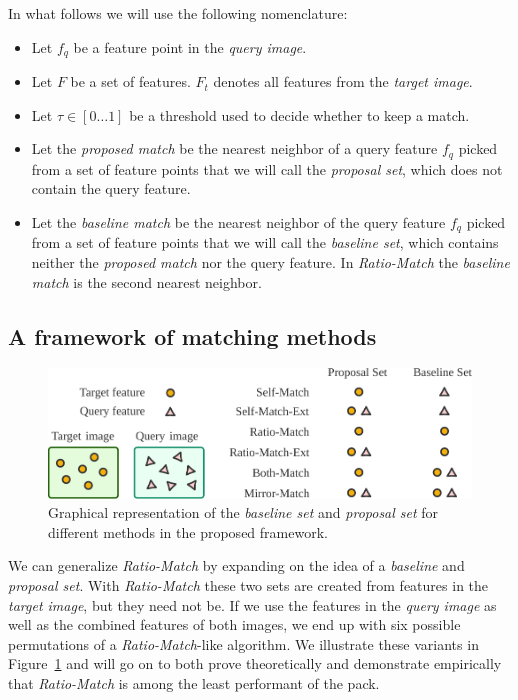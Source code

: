 \documentclass[review]{elsarticle}
\begin{document}
In what follows we will use the following nomenclature:
\begin{itemize}
\item{Let $f_q$ be a feature point in the \emph{query image}}.
\item{Let $F$ be a set of features. $F_{t}$ denotes all features from the \emph{target image}}.
\item{Let $\tau \in [0 \ldots 1]$ be a threshold used to decide whether to keep a match.} %
\item{Let the \emph{proposed match} be the nearest neighbor of a query 
    feature $f_q$ picked from a set of feature points that we will call 
the \emph{proposal set}, which does not contain the query feature}.
\item{Let the \emph{baseline match} be the nearest neighbor of the query 
    feature $f_q$ picked from a set of feature points that we will call 
the \emph{baseline set}, which contains neither the \emph{proposed match} 
nor the query feature}. In \emph{Ratio-Match} the \emph{baseline match} is the second nearest neighbor.
\end{itemize}

%
\subsection{A framework of matching methods}
%

\begin{figure}[t]
\centering
\includegraphics[width=0.95\columnwidth]{images/overview-wide}
\caption{Graphical representation of the \emph{baseline set} and \emph{proposal set} for different methods in the proposed framework.}
\label{fig:overview}
\end{figure}

We can generalize \emph{Ratio-Match} by expanding on the idea of a \emph{baseline} and \emph{proposal set}. With \emph{Ratio-Match} these two sets are created from features in the \emph{target image}, but they need not be. If we use the features in the \emph{query image} as well as the combined features of both images, we end up with six possible permutations of a \emph{Ratio-Match}-like algorithm. We illustrate these variants in Figure~\ref{fig:overview} and will go on to both prove theoretically and demonstrate empirically that \emph{Ratio-Match} is among the least performant of the pack.
\end{document}
